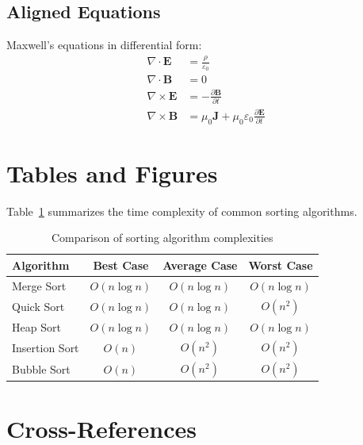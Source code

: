 \documentclass[11pt, a4paper]{article}
\begin{document}
\subsection{Aligned Equations}

Maxwell's equations in differential form:
\begin{align}
  \nabla \cdot \mathbf{E}  &= \frac{\rho}{\varepsilon_0}          \label{eq:gauss} \\
  \nabla \cdot \mathbf{B}  &= 0                                    \label{eq:gauss-mag} \\
  \nabla \times \mathbf{E} &= -\frac{\partial \mathbf{B}}{\partial t} \label{eq:faraday} \\
  \nabla \times \mathbf{B} &= \mu_0 \mathbf{J} + \mu_0 \varepsilon_0 \frac{\partial \mathbf{E}}{\partial t} \label{eq:ampere}
\end{align}

\section{Tables and Figures}

Table~\ref{tab:complexity} summarizes the time complexity of common sorting algorithms.

\begin{table}[ht]
  \centering
  \caption{Comparison of sorting algorithm complexities}
  \label{tab:complexity}
  \begin{tabular}{@{} l c c c @{}}
    \toprule
    Algorithm      & Best Case        & Average Case     & Worst Case       \\
    \midrule
    Merge Sort     & $O(n \log n)$    & $O(n \log n)$    & $O(n \log n)$    \\
    Quick Sort     & $O(n \log n)$    & $O(n \log n)$    & $O(n^2)$         \\
    Heap Sort      & $O(n \log n)$    & $O(n \log n)$    & $O(n \log n)$    \\
    Insertion Sort & $O(n)$           & $O(n^2)$         & $O(n^2)$         \\
    Bubble Sort    & $O(n)$           & $O(n^2)$         & $O(n^2)$         \\
    \bottomrule
  \end{tabular}
\end{table}

\section{Cross-References}
\end{document}
